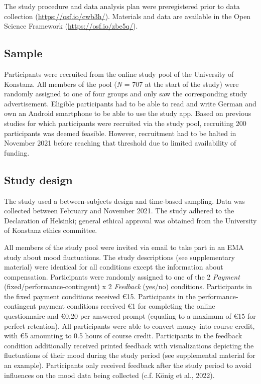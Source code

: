 \documentclass[authordate, empirical]{jote-new-article}
\begin{document}
	The study procedure and data analysis plan were preregistered prior to data collection (\href{https://osf.io/cwb3h/}{https://osf.io/cwb3h/}). Materials and data are available in the Open Science Framework (\href{https://osf.io/zbe5q/}{https://osf.io/zbe5q/}).



	\subsection{Sample}



	Participants were recruited from the online study pool of the University of Konstanz. All members of the pool (\emph{N} = 707 at the start of the study) were randomly assigned to one of four groups and only saw the corresponding study advertisement. Eligible participants had to be able to read and write German and own an Android smartphone to be able to use the study app. Based on previous studies for which participants were recruited via the study pool, recruiting 200 participants was deemed feasible. However, recruitment had to be halted in November 2021 before reaching that threshold due to limited availability of funding.



	\subsection{Study design}



	The study used a between-subjects design and time-based sampling. Data was collected between February and November 2021. The study adhered to the Declaration of Helsinki; general ethical approval was obtained from the University of Konstanz ethics committee.



	All members of the study pool were invited via email to take part in an EMA study about mood fluctuations. The study descriptions (see supplementary material) were identical for all conditions except the information about compensation. Participants were randomly assigned to one of the 2 \emph{Payment }(fixed/performance-contingent) x 2 \emph{Feedback }(yes/no) conditions. Participants in the fixed payment conditions received €15. Participants in the performance-contingent payment conditions received €1 for completing the online questionnaire and €0.20 per answered prompt (equaling to a maximum of €15 for perfect retention). All participants were able to convert money into course credit, with €5 amounting to 0.5 hours of course credit. Participants in the feedback condition additionally received printed feedback with visualizations depicting the fluctuations of their mood during the study period (see supplemental material for an example). Participants only received feedback after the study period to avoid influences on the mood data being collected (c.f. König et al., 2022).
\end{document}
